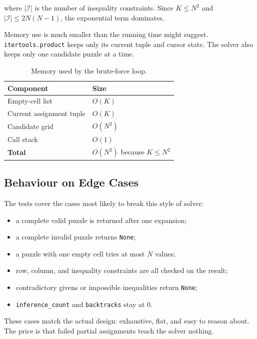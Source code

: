 where $|\mathcal{I}|$ is the number of inequality constraints. Since
$K \le N^2$ and $|\mathcal{I}| \le 2N(N-1)$, the exponential term dominates.

Memory use is much smaller than the running time might suggest.
\texttt{itertools.product} keeps only its current tuple and cursor state. The
solver also keeps only one candidate puzzle at a time.

\begin{table}[h]
  \centering
  \caption{Memory used by the brute-force loop.}
  \label{tab:bf_space2}
  \begin{tabular}{ll}
    \toprule
    Component & Size \\
    \midrule
    Empty-cell list & $O(K)$ \\
    Current assignment tuple & $O(K)$ \\
    Candidate grid & $O(N^{2})$ \\
    Call stack & $O(1)$ \\
    \midrule
    \textbf{Total} & $O(N^{2})$ because $K \le N^{2}$ \\
    \bottomrule
  \end{tabular}
\end{table}

\subsection{Behaviour on Edge Cases}

The tests cover the cases most likely to break this style of solver:

\begin{itemize}
  \item a complete valid puzzle is returned after one expansion;
  \item a complete invalid puzzle returns \texttt{None};
  \item a puzzle with one empty cell tries at most $N$ values;
  \item row, column, and inequality constraints are all checked on the result;
  \item contradictory givens or impossible inequalities return \texttt{None};
  \item \texttt{inference\_count} and \texttt{backtracks} stay at 0.
\end{itemize}

These cases match the actual design: exhaustive, flat, and easy to reason
about. The price is that failed partial assignments teach the solver nothing.

